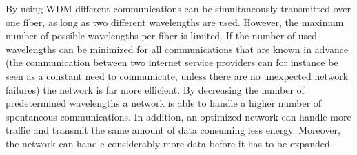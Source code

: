 \documentclass[paper=a4,fontsize=12pt]{scrartcl}
\begin{document}

By using WDM different communications can be simultaneously transmitted over one fiber, as long as two different wavelengths are used. However, the maximum number of possible wavelengths per fiber is limited. If the number of used wavelengths can be minimized for all communications that are known in advance (the communication between two internet service providers can for instance be seen as a constant need to communicate, unless there are no unexpected network failures) the network is far more efficient. By decreasing the number of predetermined wavelengths a network is able to handle a higher number of spontaneous communications. In addition, an optimized network can handle more traffic and transmit the same amount of data consuming less energy. Moreover, the network can handle considerably more data before it has to be expanded.

\end{document}
